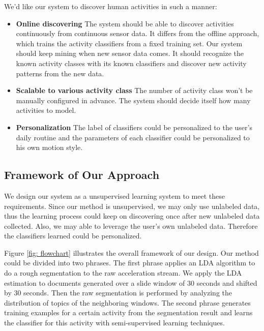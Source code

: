 \documentclass{sigchi}
\begin{document}
    We'd like our system to discover human activities in such a manner:
    \begin{itemize}
        \item \textbf{Online discovering}
        The system should be able to discover activities continuously from continuous sensor data.
        It differs from the offline approach, which trains the activity classifiers from a fixed training set.
        Our system should keep mining when new sensor data comes.
        It should recognize the known activity classes with its known classifiers and discover new activity patterns from the new data.

        \item \textbf{Scalable to various activity class}
        The number of activity class won't be manually configured in advance.
        The system should decide itself how many activities to model.

        \item \textbf{Personalization}
        The label of classifiers could be personalized to the user's daily routine and the parameters of each classifier could be personalized to his own motion style.
    \end{itemize}

\subsection{Framework of Our Approach}

    We design our system as a unsupervised learning system to meet these requirements.
    Since our method is unsupervised, we may only use unlabeled data, thus the learning process could keep on discovering once after new unlabeled data collected.
    Also, we may able to leverage the user's own unlabeled data.
    Therefore the classifiers learned could be personalized.

    Figure \ref{fig: flowchart} illustrates the overall framework of our design.
    Our method could be divided into two phrases.
    The first phrase applies an LDA algorithm to do a rough segmentation to the raw acceleration stream.
    We apply the LDA estimation to documents generated over a slide window of 30 seconds and shifted by 30 seconds.
    Then the raw segmentation is performed by analyzing the distribution of topics of the neighboring windows.
    The second phrase generates training examples for a certain activity from the segmentation result and learns the classifier for this activity with semi-supervised learning techniques.
\end{document}
